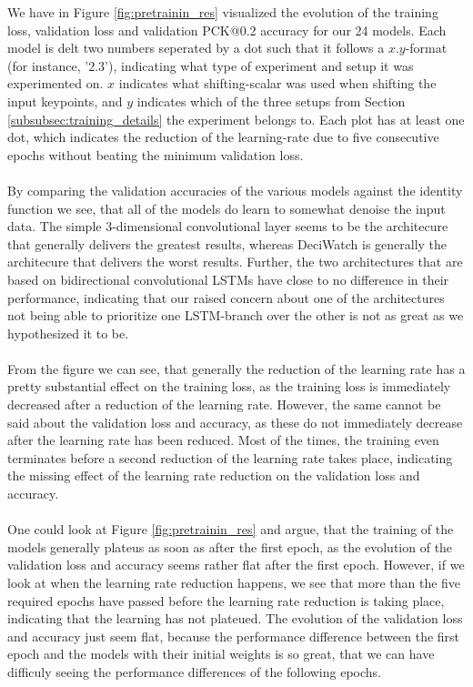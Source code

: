 \documentclass[./main.tex]{subfiles}
\begin{document}
We have in Figure \ref{fig:pretrainin_res} visualized the evolution of the training loss, validation loss and validation PCK@0.2 accuracy for our 24 models. Each model is delt two numbers seperated by a dot such that it follows a $x.y$-format (for instance, '$2.3$'), indicating what type of experiment and setup it was experimented on. $x$ indicates what shifting-scalar was used when shifting the input keypoints, and $y$ indicates which of the three setups from Section \ref{subsubsec:training_details} the experiment belongs to. Each plot has at least one dot, which indicates the reduction of the learning-rate due to five consecutive epochs without beating the minimum validation loss.
\\
\\
By comparing the validation accuracies of the various models against the identity function we see, that all of the models do learn to somewhat denoise the input data. The simple 3-dimensional convolutional layer seems to be the architecure that generally delivers the greatest results, whereas DeciWatch is generally the architecure that delivers the worst results. Further, the two architectures that are based on bidirectional convolutional LSTMs have close to no difference in their performance, indicating that our raised concern about one of the architectures not being able to prioritize one LSTM-branch over the other is not as great as we hypothesized it to be.
\\
\\
From the figure we can see, that generally the reduction of the learning rate has a pretty substantial effect on the training loss, as the training loss is immediately decreased after a reduction of the learning rate. However, the same cannot be said about the validation loss and accuracy, as these do not immediately decrease after the learning rate has been reduced. Most of the times, the training even terminates before a second reduction of the learning rate takes place, indicating the missing effect of the learning rate reduction on the validation loss and accuracy.
\\
\\
One could look at Figure \ref{fig:pretrainin_res} and argue, that the training of the models generally plateus as soon as after the first epoch, as the evolution of the validation loss and accuracy seems rather flat after the first epoch. However, if we look at when the learning rate reduction happens, we see that more than the five required epochs have passed before the learning rate reduction is taking place, indicating that the learning has not plateued. The evolution of the validation loss and accuracy just seem flat, because the performance difference between the first epoch and the models with their initial weights is so great, that we can have difficuly seeing the performance differences of the following epochs. 
\end{document}
